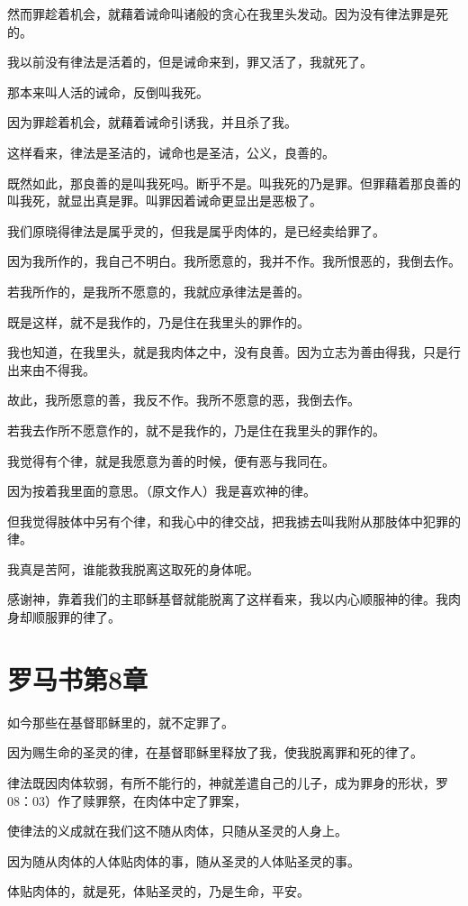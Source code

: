 \documentclass[12pt,oneside]{book}
\begin{document}
然而罪趁着机会，就藉着诫命叫诸般的贪心在我里头发动。因为没有律法罪是死的。

我以前没有律法是活着的，但是诫命来到，罪又活了，我就死了。

那本来叫人活的诫命，反倒叫我死。

因为罪趁着机会，就藉着诫命引诱我，并且杀了我。

这样看来，律法是圣洁的，诫命也是圣洁，公义，良善的。

既然如此，那良善的是叫我死吗。断乎不是。叫我死的乃是罪。但罪藉着那良善的叫我死，就显出真是罪。叫罪因着诫命更显出是恶极了。

我们原晓得律法是属乎灵的，但我是属乎肉体的，是已经卖给罪了。

因为我所作的，我自己不明白。我所愿意的，我并不作。我所恨恶的，我倒去作。

若我所作的，是我所不愿意的，我就应承律法是善的。

既是这样，就不是我作的，乃是住在我里头的罪作的。

我也知道，在我里头，就是我肉体之中，没有良善。因为立志为善由得我，只是行出来由不得我。

故此，我所愿意的善，我反不作。我所不愿意的恶，我倒去作。

若我去作所不愿意作的，就不是我作的，乃是住在我里头的罪作的。

我觉得有个律，就是我愿意为善的时候，便有恶与我同在。

因为按着我里面的意思。（原文作人）我是喜欢神的律。

但我觉得肢体中另有个律，和我心中的律交战，把我掳去叫我附从那肢体中犯罪的律。

我真是苦阿，谁能救我脱离这取死的身体呢。

感谢神，靠着我们的主耶稣基督就能脱离了这样看来，我以内心顺服神的律。我肉身却顺服罪的律了。

\chapter{罗马书第8章}
如今那些在基督耶稣里的，就不定罪了。

因为赐生命的圣灵的律，在基督耶稣里释放了我，使我脱离罪和死的律了。

律法既因肉体软弱，有所不能行的，神就差遣自己的儿子，成为罪身的形状，罗08：03）作了赎罪祭，在肉体中定了罪案，

使律法的义成就在我们这不随从肉体，只随从圣灵的人身上。

因为随从肉体的人体贴肉体的事，随从圣灵的人体贴圣灵的事。

体贴肉体的，就是死，体贴圣灵的，乃是生命，平安。
\end{document}
